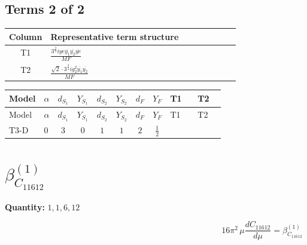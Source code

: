 \documentclass[8pt]{article}
\begin{document}
\begin{landscape}
\subsection*{Terms 2 of 2}
\begin{center}
\begin{tabular}{@{}c >{\raggedright\arraybackslash}p{0.82\linewidth}@{}}
\toprule
Column & Representative term structure \\
\midrule
T1 & \(\displaystyle \frac{3^{\frac{3}{4}} i ye \overline{y_{1}} \overline{y_{2}} \overline{ye}}{MF}\) \\
\midrule
T2 & \(\displaystyle \frac{\sqrt{2} \cdot 3^{\frac{3}{4}} i g_{2}^{2} \overline{y_{1}} \overline{y_{2}}}{MF}\) \\
\midrule
\bottomrule
\end{tabular}
\end{center}
\smallskip
\tiny
\begin{longtable}{@{}llcccccc >{\raggedright\arraybackslash}p{0.21\linewidth} >{\raggedright\arraybackslash}p{0.21\linewidth}@{}}
\toprule
Model & $\alpha$ & $d_{S_1}$ & $Y_{S_1}$ & $d_{S_2}$ & $Y_{S_2}$ & $d_F$ & $Y_F$ & T1 & T2 \\
\midrule
\endfirsthead
\toprule
Model & $\alpha$ & $d_{S_1}$ & $Y_{S_1}$ & $d_{S_2}$ & $Y_{S_2}$ & $d_F$ & $Y_F$ & T1 & T2 \\
\midrule
\endhead
T3-D & $0$ & $3$ & $0$ & $1$ & $1$ & $2$ & $\frac{1}{2}$ & \scriptsize\adjustbox{max width=\linewidth}{$\begin{gathered} - \frac{3^{\frac{3}{4}} i ye \overline{y_{1}} \overline{y_{2}} \overline{ye}}{12 MF}\end{gathered}$} & \scriptsize\adjustbox{max width=\linewidth}{$\begin{gathered} \frac{\sqrt{2} \cdot 3^{\frac{3}{4}} i g_{2}^{2} \overline{y_{1}} \overline{y_{2}}}{3 MF}\end{gathered}$} \\
\midrule
\bottomrule
\end{longtable}
\clearpage
\section*{$\beta_{C_{11612}}^{(1)}$}
\noindent\textbf{Quantity: }$\mathrm{1,1,6,12}$\par\smallskip
\[16\pi^2\,\mu\frac{d C_{11612}}{d\mu}=\beta_{C_{11612}}^{(1)}\]

\end{landscape}
\end{document}

